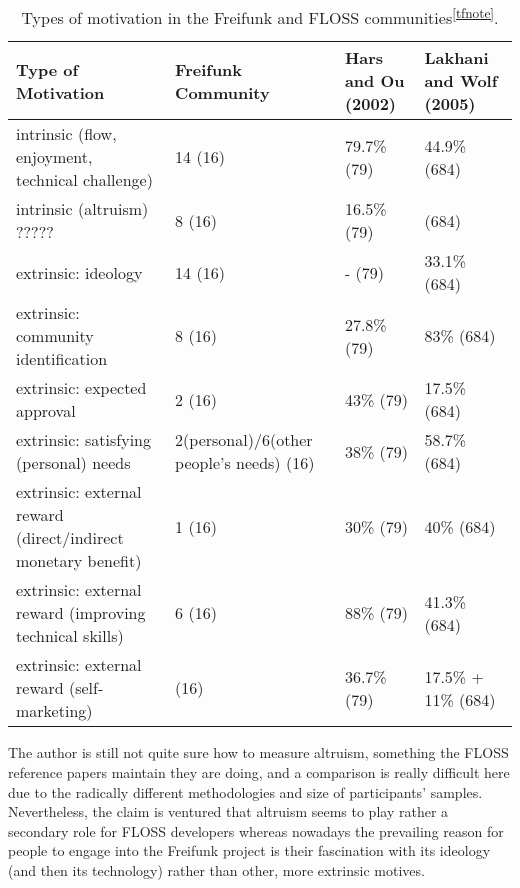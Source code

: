 \begin{table}[h]
  \begin{tabular}{| p{4cm} | p{4cm} | p{4cm} | p{4cm} |}
    \hline
    \textbf{Type of Motivation} & \textbf{Freifunk Community} & \textbf{Hars and Ou (2002)} & \textbf{Lakhani and Wolf (2005)}\\
    \hline
    intrinsic (flow, enjoyment, technical challenge) & 14 (16) & 79.7\% (79) & 44.9\% (684) \\
    \hline
    intrinsic (altruism) ????? & 8 (16) & 16.5\% (79) &  (684) \\
    \hline
    extrinsic: ideology & 14 (16) & - (79)& 33.1\% (684) \\
    \hline
    extrinsic: community identification & 8 (16) & 27.8\% (79)& 83\% (684) \\
    \hline
    extrinsic: expected approval & 2 (16)& 43\% (79)& 17.5\% (684) \\
    \hline
    extrinsic: satisfying (personal) needs & 2(personal)/6(other people's needs) (16) & 38\% (79) & 58.7\% (684) \\
    \hline
    extrinsic: external reward (direct/indirect monetary benefit)& 1 (16) & 30\% (79) & 40\% (684) \\
    \hline
    extrinsic: external reward (improving technical skills)& 6 (16) & 88\% (79) & 41.3\% (684) \\
    \hline
    extrinsic: external reward (self-marketing)& (16) & 36.7\% (79)& 17.5\% + 11\% (684) \\
    \hline
  \end{tabular}
  \caption{Types of motivation in the Freifunk and FLOSS communities\textsuperscript{\ref{tfnote}}.}
\label{tab:motivation}
\end{table}



The author is still not quite sure how to measure altruism, something the FLOSS reference papers maintain they are doing, and a comparison is really difficult here due to the radically different methodologies and size of participants' samples.
Nevertheless, the claim is ventured that altruism seems to play rather a secondary role for FLOSS developers whereas nowadays the prevailing reason for people to engage into the Freifunk project is their fascination with its ideology (and then its technology) rather than other, more extrinsic motives.


